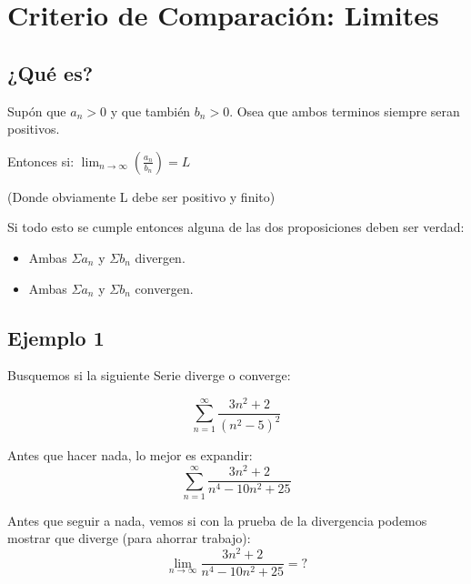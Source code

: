\documentclass[12pt]{report}							    %
\begin{document}
    \clearpage
    \section{Criterio de Comparación: Limites}


    \subsection{¿Qué es?}
    Supón que $a _n > 0$ y que también $b_n > 0$. Osea que ambos terminos siempre seran positivos.

    Entonces si:
    $\lim_{n \to \infty} \left( \frac{a_n}{b_n} \right) = L$

    (Donde obviamente L debe ser positivo y finito)

    Si todo esto se cumple entonces alguna de las dos proposiciones deben ser verdad:
    \begin{itemize}
        \item Ambas $\Sigma a_n$ y $\Sigma b_n$ divergen.
        \item Ambas $\Sigma a_n$ y $\Sigma b_n$ convergen.
    \end{itemize}

    \cite{Sitio1}

    \subsection{Ejemplo 1}
    Busquemos si la siguiente Serie diverge o converge:

    \begin{equation*}
        \sum_{n=1}^{\infty} \frac{3n^2+2}{(n^2-5)^2}
    \end{equation*}

    Antes que hacer nada, lo mejor es expandir:
    \begin{equation*}
        \sum_{n=1}^{\infty} \frac{3n^2+2}{n^4-10n^2+25}
    \end{equation*}
     
    Antes que seguir a nada, vemos si con la prueba de la divergencia podemos mostrar que diverge
    (para ahorrar trabajo):
    \begin{equation*}
        \lim_{n \to \infty} \frac{3n^2+2}{n^4-10n^2+25} = ?
    \end{equation*}
\end{document}
